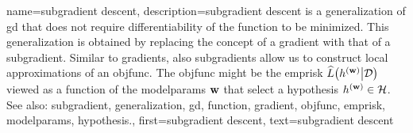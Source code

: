 {name={subgradient descent}, 
	description={\Gls{subgradient} 
		descent is a \gls{generalization} of \gls{gd} that does not require differentiability of the 
		\gls{function} to be minimized. This \gls{generalization} is obtained by replacing the concept 
		of a \gls{gradient} with that of a \gls{subgradient}. Similar to \glspl{gradient}, also \glspl{subgradient} 
		allow us to construct local approximations of an \gls{objfunc}. The \gls{objfunc} 
		might be the \gls{emprisk} $\widehat{L}\big( h^{({\bf w})} \big| \mathcal{D} \big)$ viewed 
		as a \gls{function} of the \gls{modelparams} ${\bf w}$ that select a \gls{hypothesis} $h^{({\bf w})} \in \mathcal{H}$.
				\\
		See also: \gls{subgradient}, \gls{generalization}, \gls{gd}, \gls{function}, \gls{gradient}, \gls{objfunc}, \gls{emprisk}, \gls{modelparams}, \gls{hypothesis}.},
	first={subgradient descent},
	text={subgradient descent} 
}
	
